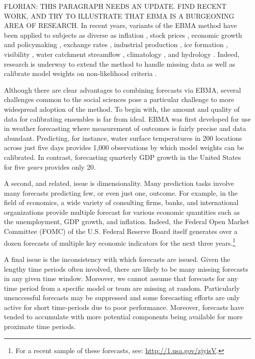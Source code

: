 \documentclass[12pt,fullpage,endnotes]{article}
\begin{document}
FLORIAN: THIS PARAGRAPH NEEDS AN UPDATE.  FIND RECENT WORK, AND TRY TO
ILLUSTRATE THAT EBMA IS A BURGEONING AREA OF RESEARCH.  In recent
years, variants of the EBMA method have been applied to subjects as
diverse as inflation \citep{Wright:2009, Koop:2010, Gneiting:2010},
stock prices \citep{Billio:2011}, economic growth and policymaking
\citep{Brock:2007, Billio:2010}, exchange rates \citep{Wright:2008},
industrial production \citep{Feldkircher:2010}, ice formation
\citep{Berrocal:2010}, visibility \citep{Chmielecki:2010}, water
catchment streamflow \citep{Viney:2009}, climatology \citep{Min:2006,
  Min:2007, Smith:2009}, and hydrology \citep{Zhang:2009}.  Indeed,
research is underway to extend the method to handle missing data
\citep{Fraley:2010, Mccandless:2011} as well as calibrate model
weights on non-likelihood criteria \citep[e.g.,][]{Vrugt:2006}.

Although there are clear advantages to combining forecasts via EBMA,
several challenges common to the social sciences pose a particular
challenge to more widespread adoption of the method.  To begin with,
the amount and quality of data for calibrating ensembles is far from
ideal.  EBMA was first developed for use in weather forecasting where
measurement of outcomes is fairly precise and data abundant.
Predicting, for instance, water surface temperatures in 200 locations
across just five days provides 1,000 observations by which model
weights can be calibrated.  In contrast, forecasting quarterly GDP
growth in the United States for five \textit{years} provides only 20.

A second, and related, issue is dimensionality. Many prediction tasks
involve many forecasts predicting few, or even just one, outcome.  For
example, in the field of economics, a wide variety of consulting
firms, banks, and international organizations provide multiple
forecast for various economic quantities such as the unemployment, GDP
growth, and inflation.  Indeed, the Federal Open Market Committee
(FOMC) of the U.S. Federal Reserve Board itself generates over a dozen
forecasts of multiple key economic indicators for the next three
years.\footnote{For a recent sample of these forecasts, see:
  \url{http://1.usa.gov/zjyisV}.}

A final issue is the inconsistency with which forecasts are
issued. Given the lengthy time periods often involved, there are
likely to be many missing forecasts in any given time window.
Moreover, we cannot assume that forecasts for any time period from a
specific model or team are missing at random.  Particularly
unsuccessful forecasts may be suppressed and some forecasting efforts
are only active for short time-periods due to poor performance.
Moreover, forecasts have tended to accumulate with more potential
components being available for more proximate time periods.
\end{document}
